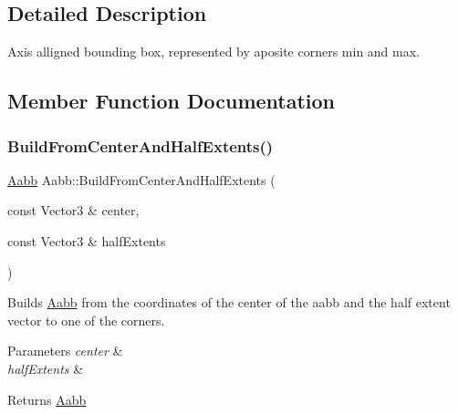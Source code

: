 \subsection{Detailed Description}
Axis alligned bounding box, represented by aposite corners min and max. 

\subsection{Member Function Documentation}
\mbox{\label{classAabb_a97ee8719ddae080c16c206f5724b5a9f}} 
\subsubsection{\texorpdfstring{Build\+From\+Center\+And\+Half\+Extents()}{BuildFromCenterAndHalfExtents()}}
{\footnotesize\ttfamily \hyperlink{classAabb}{Aabb} Aabb\+::\+Build\+From\+Center\+And\+Half\+Extents (\begin{DoxyParamCaption}\item[{const Vector3 \&}]{center,  }\item[{const Vector3 \&}]{half\+Extents }\end{DoxyParamCaption})\hspace{0.3cm}{\ttfamily [static]}}



Builds \hyperlink{classAabb}{Aabb} from the coordinates of the center of the aabb and the half extent vector to one of the corners. 


\begin{DoxyParams}{Parameters}
{\em center} & \\
\hline
{\em half\+Extents} & \\
\hline
\end{DoxyParams}
\begin{DoxyReturn}{Returns}
\hyperlink{classAabb}{Aabb} 
\end{DoxyReturn}
\mbox{\label{classAabb_a32c65313d0c0b6f3918473340cd7c129}} 
